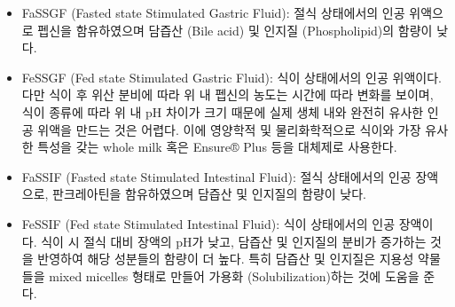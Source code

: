 \documentclass[
  11pt,
  krantz2, a4paper, twoside]{krantz}
\providecommand{\tightlist}{%
  \setlength{\itemsep}{0pt}\setlength{\parskip}{0pt}}
\begin{document}
\begin{itemize}
\tightlist
\item
  FaSSGF (Fasted state Stimulated Gastric Fluid): 절식 상태에서의 인공
  위액으로 펩신을 함유하였으며 담즙산 (Bile acid) 및 인지질
  (Phospholipid)의 함량이 낮다.
\item
  FeSSGF (Fed state Stimulated Gastric Fluid): 식이 상태에서의 인공
  위액이다. 다만 식이 후 위산 분비에 따라 위 내 펩신의 농도는 시간에
  따라 변화를 보이며, 식이 종류에 따라 위 내 pH 차이가 크기 때문에
  실제 생체 내와 완전히 유사한 인공 위액을 만드는 것은 어렵다. 이에
  영양학적 및 물리화학적으로 식이와 가장 유사한 특성을 갖는 whole milk
  혹은 Ensure® Plus 등을 대체제로 사용한다.
\item
  FaSSIF (Fasted state Stimulated Intestinal Fluid): 절식 상태에서의
  인공 장액으로, 판크레아틴을 함유하였으며 담즙산 및 인지질의 함량이
  낮다.
\item
  FeSSIF (Fed state Stimulated Intestinal Fluid): 식이 상태에서의 인공
  장액이다. 식이 시 절식 대비 장액의 pH가 낮고, 담즙산 및 인지질의
  분비가 증가하는 것을 반영하여 해당 성분들의 함량이 더 높다. 특히
  담즙산 및 인지질은 지용성 약물들을 mixed micelles 형태로 만들어
  가용화 (Solubilization)하는 것에 도움을 준다.
\end{itemize}
\end{document}

